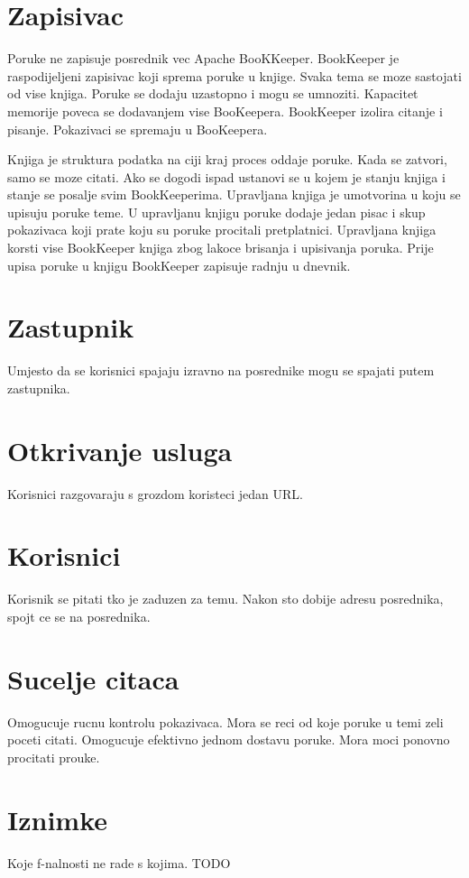 \documentclass[times, utf8, diplomski, numeric]{fer}
\begin{document}
\chapter{Zapisivac}
Poruke ne zapisuje posrednik vec Apache BooKKeeper. BookKeeper je raspodijeljeni zapisivac koji sprema poruke u knjige. Svaka tema se moze sastojati od vise knjiga. Poruke se dodaju uzastopno i mogu se umnoziti. Kapacitet memorije poveca se dodavanjem vise BooKeepera. BookKeeper izolira citanje i pisanje. Pokazivaci se spremaju u BooKeepera. 

Knjiga je struktura podatka na ciji kraj proces oddaje poruke. Kada se zatvori, samo se moze citati. Ako se dogodi ispad ustanovi se u kojem je stanju knjiga i stanje se posalje svim BookKeeperima. Upravljana knjiga je umotvorina u koju se upisuju poruke teme. U upravljanu knjigu poruke dodaje jedan pisac i skup pokazivaca koji prate koju su poruke procitali pretplatnici. Upravljana knjiga korsti vise BookKeeper knjiga zbog lakoce brisanja i upisivanja poruka. Prije upisa poruke u knjigu BookKeeper zapisuje radnju u dnevnik. 

\chapter{Zastupnik}
Umjesto da se korisnici spajaju izravno na posrednike mogu se spajati putem zastupnika.

\chapter{Otkrivanje usluga}
Korisnici razgovaraju s grozdom koristeci jedan URL.

\chapter{Korisnici}
Korisnik se pitati tko je zaduzen za temu. Nakon sto dobije adresu posrednika, spojt ce se na posrednika.

\chapter{Sucelje citaca}
Omogucuje rucnu kontrolu pokazivaca. Mora se reci od koje poruke u temi zeli poceti citati. Omogucuje efektivno jednom dostavu poruke. Mora moci ponovno procitati prouke.

\chapter{Iznimke}
Koje f-nalnosti ne rade s kojima. TODO
\end{document}
